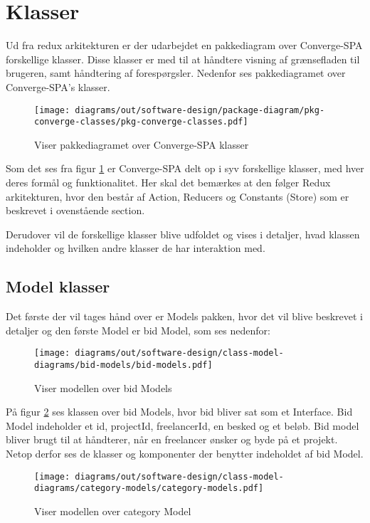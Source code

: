 \section{Klasser}
Ud fra redux arkitekturen er der udarbejdet en pakkediagram over Converge-SPA forskellige klasser. Disse klasser er med til at håndtere visning af grænsefladen til brugeren, samt håndtering af forespørgsler. Nedenfor ses pakkediagramet over Converge-SPA's klasser.

\begin{figure}[H]
    \centering
\texttt{[image: diagrams/out/software-design/package-diagram/pkg-converge-classes/pkg-converge-classes.pdf]}
\caption{Viser pakkediagramet over Converge-SPA klasser}
\label{fig:packagediagram}
\end{figure}

Som det ses fra figur \ref{fig:packagediagram} er Converge-SPA delt op i syv forskellige klasser, med hver deres formål og funktionalitet. Her skal det bemærkes at den følger Redux arkitekturen, hvor den består af Action, Reducers og Constants (Store) som er beskrevet i ovenstående section. 

Derudover vil de forskellige klasser blive udfoldet og vises i detaljer, hvad klassen indeholder og hvilken andre klasser de har interaktion med.

\subsection{Model klasser}

Det første der vil tages hånd over er Models pakken, hvor det vil blive beskrevet i detaljer og den første Model er bid Model, som ses nedenfor:

\begin{figure}[H]
    \centering
\texttt{[image: diagrams/out/software-design/class-model-diagrams/bid-models/bid-models.pdf]}
\caption{Viser modellen over bid Models}
\label{fig:bidmodels}
\end{figure}

På figur \ref{fig:bidmodels} ses klassen over bid Models, hvor bid bliver sat som et Interface. Bid Model indeholder et id, projectId, freelancerId, en besked og et beløb. Bid model bliver brugt til at håndterer, når en freelancer ønsker og byde på et projekt. Netop derfor ses de klasser og komponenter der benytter indeholdet af bid Model. 


\begin{figure}[H]
    \centering
\texttt{[image: diagrams/out/software-design/class-model-diagrams/category-models/category-models.pdf]}
\caption{Viser modellen over category Model}
\label{fig:category}
\end{figure}

